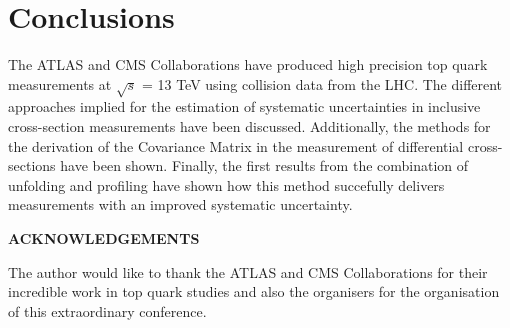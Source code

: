 \documentclass[12pt]{article}
\def\Acknowledgements{\bigskip  \bigskip \begin{center} \begin{large}
             \bf ACKNOWLEDGEMENTS \end{large}\end{center}}
\begin{document}
\section{Conclusions}
The ATLAS and CMS Collaborations have produced high precision top quark measurements at $\sqrt{s}$ = 13 TeV using collision data from the LHC. The different approaches implied for the estimation of systematic uncertainties in inclusive cross-section measurements have been discussed. Additionally, the methods for the derivation of the Covariance Matrix in the measurement of differential cross-sections have been shown. Finally, the first results from the combination of unfolding and profiling have shown how this method succefully delivers measurements with an improved systematic uncertainty.






\Acknowledgements
The author would like to thank the ATLAS and CMS Collaborations for their incredible work in top quark studies and also the organisers for the organisation of this extraordinary conference.
\end{document}
